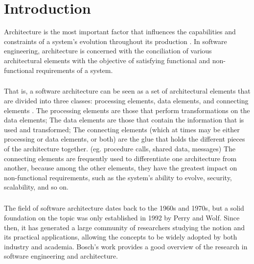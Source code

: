 
%

\chapter{Introduction}
\label{cha:introduction}

Architecture is the most important factor that influences the capabilities and constraints of a system's evolution throughout its production \cite{Breivold2012}.
In software engineering, architecture is concerned with the conciliation of various architectural elements with the objective of satisfying functional and non-functional requirements of a system.

\paragraph{}

That is, a software architecture can be seen as a set of architectural elements that are divided into three classes: processing elements, data elements, and connecting elements \cite{2}.
The processing elements are those that perform transformations on the data elements;
The data elements are those that contain the information that is used and transformed;
The connecting elements (which at times may be either processing or data elements, or both) are the glue that holds the different pieces of the architecture together.
(eg. procedure calls, shared data, messages)
The connecting elements are frequently used to differentiate one architecture from another,
because among the other elements, they have the greatest impact on non-functional requirements, such as the system's ability to evolve, security, scalability, and so on.

\paragraph{}

The field of software architecture dates back to the 1960s and 1970s, but a solid foundation on the topic was only established in 1992 by Perry and Wolf.
Since then, it has generated a large community of researchers studying the notion and its practical applications,
allowing the concepts to be widely adopted by both industry and academia.
Bosch's work \cite{3, 4} provides a good overview of the research in software engineering and architecture.

